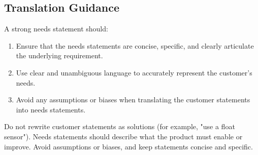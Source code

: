 \subsection{Translation Guidance}
\label{sec:Translation_guidance}
A strong needs statement should:
    \begin{enumerate}
        \item Ensure that the needs statements are concise, specific, and clearly articulate the underlying requirement.
        \item Use clear and unambiguous language to accurately represent the customer's needs.
        \item Avoid any assumptions or biases when translating the customer statements into needs statements.
    \end{enumerate}

\begin{tcolorbox}[title=Common Mistakes]
Do not rewrite customer statements as solutions (for example, "use a float sensor"). Needs statements should describe what the product must enable or improve. Avoid assumptions or biases, and keep statements concise and specific.
\end{tcolorbox}



